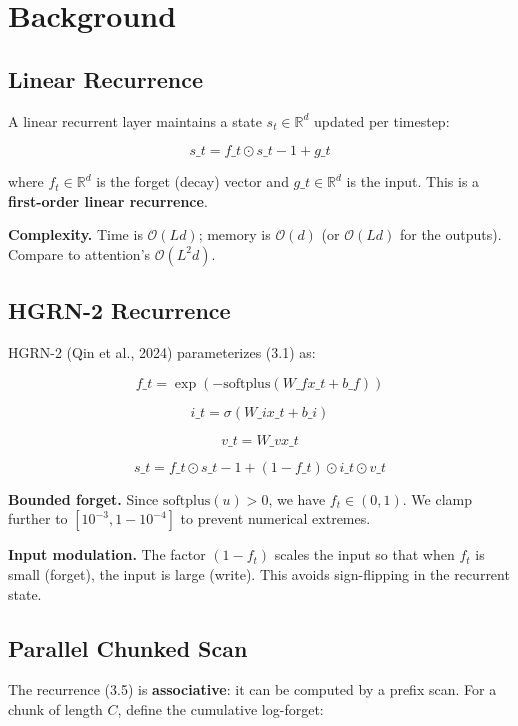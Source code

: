 \section{Background}

\subsection{Linear Recurrence}

A linear recurrent layer maintains a state $s_t \in \mathbb{R}^d$ updated 
per timestep:

\[
s\_t = f\_t \odot s\_{t-1} + g\_t
\tag{3.1}
\]

where $f_t \in \mathbb{R}^d$ is the forget (decay) vector and $g\_t \in 
\mathbb{R}^d$ is the input. This is a \textbf{first-order linear recurrence}.

\textbf{Complexity.} Time is $\mathcal{O}(L d)$; memory is $\mathcal{O}(d)$ (or 
$\mathcal{O}(L d)$ for the outputs). Compare to attention's $\mathcal{O}(L^2 d)$.

\subsection{HGRN-2 Recurrence}

HGRN-2 (Qin et al., 2024) parameterizes (3.1) as:

\[
f\_t = \exp(-\text{softplus}(W\_f x\_t + b\_f))
\tag{3.2}
\]

\[
i\_t = \sigma(W\_i x\_t + b\_i)
\tag{3.3}
\]

\[
v\_t = W\_v x\_t
\tag{3.4}
\]

\[
s\_t = f\_t \odot s\_{t-1} + (1 - f\_t) \odot i\_t \odot v\_t
\tag{3.5}
\]

\textbf{Bounded forget.} Since $\text{softplus}(u) > 0$, we have $f_t \in (0, 1)$. 
We clamp further to $[10^{-3}, 1 - 10^{-4}]$ to prevent numerical extremes.

\textbf{Input modulation.} The factor $(1 - f_t)$ scales the input so that when 
$f_t$ is small (forget), the input is large (write). This avoids sign-flipping 
in the recurrent state.

\subsection{Parallel Chunked Scan}

The recurrence (3.5) is \textbf{associative}: it can be computed by a prefix scan. 
For a chunk of length $C$, define the cumulative log-forget:


